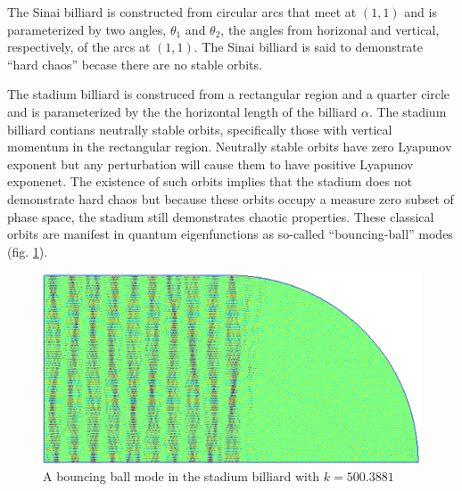 \documentclass{report}
\begin{document}
The Sinai billiard is constructed from circular arcs that meet at $(1,1)$ and is parameterized by two angles, $\theta_{1}$ and $\theta_{2}$, the angles from horizonal and vertical, respectively, of the arcs at $(1,1)$. The Sinai billiard is said to demonstrate ``hard chaos'' becase there are no stable orbits.

The stadium billiard is construced from a rectangular region and a quarter circle and is parameterized by the the horizontal length of the billiard $\alpha$. The stadium billiard contians neutrally stable orbits, specifically those with vertical momentum in the rectangular region. Neutrally stable orbits have zero Lyapunov exponent but any perturbation will cause them to have positive Lyapunov exponenet. The existence of such orbits implies that the stadium does not demonstrate hard chaos but because these orbits occupy a measure zero subset of phase space, the stadium still demonstrates chaotic properties. These classical orbits are manifest in quantum eigenfunctions as so-called ``bouncing-ball'' modes (fig. \ref{fig:bouncing_ball_mode}).

\begin{figure}
  \begin{center}
    \includegraphics[width=\textwidth]{figs/classical/stadium_eigenfunction_bouncing_ball_mode.eps}
    \caption{A bouncing ball mode in the stadium billiard with $k = 500.3881$}
    \label{fig:bouncing_ball_mode}
  \end{center}
\end{figure}
\end{document}
